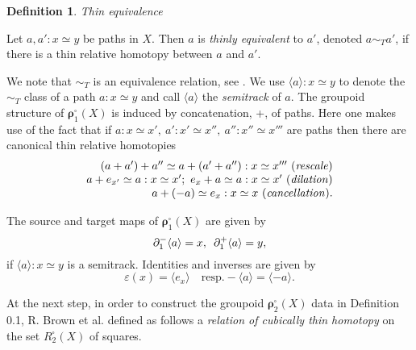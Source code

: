 \documentclass[12pt]{article}
\theoremstyle{plain}
\theoremstyle{definition}
\newtheorem{definition}{Definition}[section]
\numberwithin{equation}{section}
\newcommand{\<}{{\langle}}
\begin{document}
\begin{definition} \emph{Thin equivalence}

 Let $ a,a' : x \simeq y $ be paths in $ X $. Then
$ a$ is \emph{ thinly equivalent} to $ a' $, denoted $ a \sim_{T} a' $, if
there is a thin relative homotopy between $ a $ and $ a' $.

 We note that $ \sim_{T} $ is an equivalence relation, see
\cite{BHKP}. We use $ \langle a \rangle : x \simeq y $ to denote
the $ \sim_{T} $ class of a path $ a: x \simeq y $ and call $
\langle a \rangle $  the {\it semitrack} of $ a $. The groupoid
structure of $ \boldsymbol{\rho}^\square_1 (X) $ is induced by concatenation,
+, of paths. Here one makes use of the fact that if $ a: x \simeq
x', \ a' : x' \simeq x'', \ a'' : x'' \simeq x''' $ are paths then
there are canonical thin relative homotopies
\[
\begin{array}{r}
(a+a') + a'' \simeq a+ (a' +a'') : x \simeq x''' \ ({\it rescale}) \\
a+e_{x'} \simeq a:x \simeq x' ; \ e_{x} + a \simeq a: x \simeq x' \
({\it dilation}) \\
a+(-a) \simeq e_{x} : x \simeq x \ ({\it cancellation}).
\end{array}
\]

The source and target maps of  $\boldsymbol{\rho}^\square_1 (X)$ are given by
$$\partial^{-}_{1} \langle a\rangle =x,\enskip \partial^{+}_{1}
\langle a\rangle =y,$$
if $\langle a\rangle :x\simeq y$ is a semitrack. Identities and inverses
are given by
$$\varepsilon (x)=\langle e_x\rangle  \quad \mathrm{ resp.} -\langle a\rangle
=\langle -a \rangle.$$
\end{definition}

At the next step, in order to construct the groupoid $\boldsymbol{\rho}^{\square}_2 (X)$
data in Definition 0.1, R. Brown et al. defined as follows a 
\emph{relation of cubically thin homotopy} on the set $R^{\square}_2(X)$ of squares.
\end{document}
